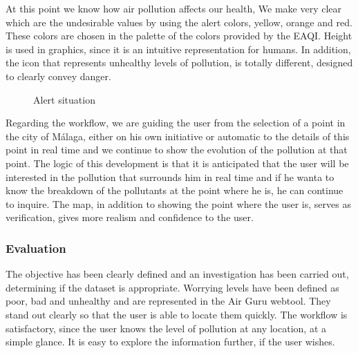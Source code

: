At this point we know how air pollution affects our health, We make very clear which are the undesirable values by using the alert colors, yellow, orange and 
red. These colors are chosen in the palette of the colors provided by the EAQI.
Height is used in graphics, since it is an intuitive representation for humans. In addition, the icon that represents unhealthy levels of pollution, is
totally different, designed to clearly convey danger. \\
\begin{figure}[ht]
    \centering
    \hfill
  
  \caption{Alert situation}
    \end{figure}

    Regarding the workflow, we are guiding the user from the selection of a point in the city of Málaga, either on his own initiative
    or automatic to the details of this point in real time and we continue to show  the evolution of the pollution at that point.
    The logic of this development is that it is anticipated that the user will be interested in the pollution that surrounds him in real time and if
    he wanta to know the breakdown of the pollutants at the point where he is, he can continue to inquire. The map, in addition to showing
    the point where the user is, serves as verification, gives more realism and confidence to the user.

\subsubsection*{Evaluation}

\begin{itemize}
    \done The objective has been clearly defined and an investigation has been carried out, determining if the dataset is appropriate.
    \done Worrying levels have been defined as poor, bad and unhealthy and are represented in the Air Guru webtool. They stand out clearly so that the user is able to locate them quickly.
    \done The workflow is satisfactory, since the user knows the level of pollution at any location, at a simple glance. It is easy to explore the information further, if the user wishes.
\end{itemize}
